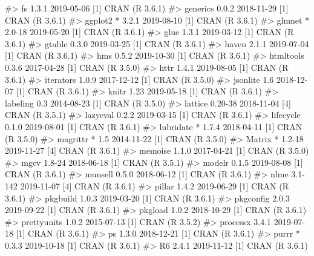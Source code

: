 \documentclass[
]{jss}
\begin{document}
\begin{CodeChunk}
\begin{CodeOutput}
#>  fs            1.3.1      2019-05-06 [1] CRAN (R 3.6.1)                  
#>  generics      0.0.2      2018-11-29 [1] CRAN (R 3.6.1)                  
#>  ggplot2     * 3.2.1      2019-08-10 [1] CRAN (R 3.6.1)                  
#>  glmnet      * 2.0-18     2019-05-20 [1] CRAN (R 3.6.1)                  
#>  glue          1.3.1      2019-03-12 [1] CRAN (R 3.6.1)                  
#>  gtable        0.3.0      2019-03-25 [1] CRAN (R 3.6.1)                  
#>  haven         2.1.1      2019-07-04 [1] CRAN (R 3.6.1)                  
#>  hms           0.5.2      2019-10-30 [1] CRAN (R 3.6.1)                  
#>  htmltools     0.3.6      2017-04-28 [1] CRAN (R 3.5.0)                  
#>  httr          1.4.1      2019-08-05 [1] CRAN (R 3.6.1)                  
#>  iterators     1.0.9      2017-12-12 [1] CRAN (R 3.5.0)                  
#>  jsonlite      1.6        2018-12-07 [1] CRAN (R 3.6.1)                  
#>  knitr         1.23       2019-05-18 [1] CRAN (R 3.6.1)                  
#>  labeling      0.3        2014-08-23 [1] CRAN (R 3.5.0)                  
#>  lattice       0.20-38    2018-11-04 [4] CRAN (R 3.5.1)                  
#>  lazyeval      0.2.2      2019-03-15 [1] CRAN (R 3.6.1)                  
#>  lifecycle     0.1.0      2019-08-01 [1] CRAN (R 3.6.1)                  
#>  lubridate   * 1.7.4      2018-04-11 [1] CRAN (R 3.5.0)                  
#>  magrittr    * 1.5        2014-11-22 [1] CRAN (R 3.5.0)                  
#>  Matrix      * 1.2-18     2019-11-27 [4] CRAN (R 3.6.1)                  
#>  memoise       1.1.0      2017-04-21 [1] CRAN (R 3.5.0)                  
#>  mgcv          1.8-24     2018-06-18 [1] CRAN (R 3.5.1)                  
#>  modelr        0.1.5      2019-08-08 [1] CRAN (R 3.6.1)                  
#>  munsell       0.5.0      2018-06-12 [1] CRAN (R 3.6.1)                  
#>  nlme          3.1-142    2019-11-07 [4] CRAN (R 3.6.1)                  
#>  pillar        1.4.2      2019-06-29 [1] CRAN (R 3.6.1)                  
#>  pkgbuild      1.0.3      2019-03-20 [1] CRAN (R 3.6.1)                  
#>  pkgconfig     2.0.3      2019-09-22 [1] CRAN (R 3.6.1)                  
#>  pkgload       1.0.2      2018-10-29 [1] CRAN (R 3.6.1)                  
#>  prettyunits   1.0.2      2015-07-13 [1] CRAN (R 3.5.2)                  
#>  processx      3.4.1      2019-07-18 [1] CRAN (R 3.6.1)                  
#>  ps            1.3.0      2018-12-21 [1] CRAN (R 3.6.1)                  
#>  purrr       * 0.3.3      2019-10-18 [1] CRAN (R 3.6.1)                  
#>  R6            2.4.1      2019-11-12 [1] CRAN (R 3.6.1)                  

\end{CodeOutput}
\end{CodeChunk}
\end{document}
